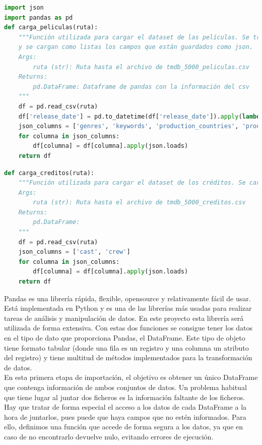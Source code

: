 \begin{lstlisting}[language=Python, caption={Lectura de los datos del fichero de películas. Se carga el fichero desde la ruta y se mapea la fecha de lanzamiento a un objeto de tipo fecha.}]
import json
import pandas as pd
def carga_peliculas(ruta):
    """Función utilizada para cargar el dataset de las películas. Se transforma a fecha el campo de fecha de salida
    y se cargan como listas los campos que están guardados como json.
    Args:
        ruta (str): Ruta hasta el archivo de tmdb_5000_peliculas.csv
    Returns:
        pd.DataFrame: Dataframe de pandas con la información del csv
    """
    df = pd.read_csv(ruta)
    df['release_date'] = pd.to_datetime(df['release_date']).apply(lambda x: x.date())
    json_columns = ['genres', 'keywords', 'production_countries', 'production_companies', 'spoken_languages']
    for columna in json_columns:
        df[columna] = df[columna].apply(json.loads)
    return df
\end{lstlisting}

\begin{lstlisting}[language=Python, caption={Lectura de los datos del fichero de créditos. Se carga el fichero desde la ruta dada.}]
def carga_creditos(ruta):
    """Función utilizada para cargar el dataset de los créditos. Se cargan como listas los campos que están guardado
    Args:
        ruta (str): Ruta hasta el archivo de tmdb_5000_creditos.csv
    Returns:
        pd.DataFrame:
    """
    df = pd.read_csv(ruta)
    json_columns = ['cast', 'crew']
    for columna in json_columns:
        df[columna] = df[columna].apply(json.loads)
    return df
\end{lstlisting}

Pandas es una librería rápida, flexible, opensource y relativamente fácil de usar. Está implementada en Python y es una de las librerías más usadas para realizar tareas de análisis y manipulación de datos. En este proyecto esta librería será utilizada de forma extensiva. Con estas dos funciones se consigue tener los datos en el tipo de dato que proporciona Pandas, el DataFrame. Este tipo de objeto tiene formato tabular (donde una fila es un registro y una columna un atributo del registro) y tiene multitud de métodos implementados para la transformación de datos.\\

En esta primera etapa de importación, el objetivo es obtener un único DataFrame que contenga información de ambos conjuntos de datos. Un problema habitual que tiene lugar al juntar dos ficheros es la información faltante de los ficheros. Hay que tratar de forma especial el acceso a los datos de cada DataFrame a la hora de juntarlos, pues puede que haya campos que no estén informados. Para ello, definimos una función que accede de forma segura a los datos, ya que en caso de no encontrarlo devuelve nulo, evitando errores de ejecución.

